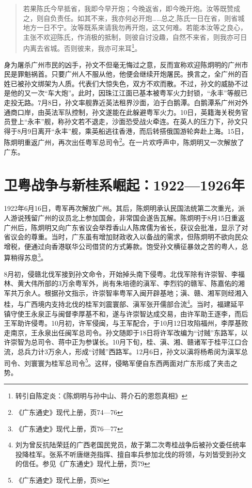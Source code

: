\begin{quote}
若果陈氏今早抵省，我即今早开炮；今晚返省，即今晚开炮。汝等既赞成之，则自负责任。如其不来，我亦何必开炮……总之,陈氏一日在省，则省城地方一日不宁。汝等既系来请我勿再开炮，这又何难。若能本汝等之良心，主张不欢迎陈氏，作消极的抵制，则彼自讨没趣，自然不来省，则我亦可日内离去省城。否则彼来，我亦可来耳\footnote{转引自陈定炎：《陈炯明与孙中山、蒋介石的恩怨真相》}。

\end{quote}

身为屠杀广州市民的凶手，孙文不但毫无悔过之意，反而宣称欢迎陈炯明的广州市民是罪魁祸首。只要广州人不服从他，他便会继续开炮屠民。换言之，全广州的百姓已被孙文绑架为人质。代表们大惊失色，双方不欢而散。不过，孙文的威胁不过是他的又一次“车大炮”。此时，因珠江江面已基本被粤军火力封锁，“永丰”等舰已走投无路。7月8日，孙文率舰靠近英法租界沙面，泊于白鹅潭。白鹅潭系广州对外通商口岸，由英法军队控制，孙文遂能在此躲避粤军火力。10日，英籍海关税务官员登上“永丰”舰，称孙文若不退走，沙面恐受战火牵连。在英人的压力下，孙文只得于8月9日离开“永丰”舰，乘英船逃往香港，而后转搭俄国游轮奔赴上海。15日，陈炯明重返广州，再次出任粤军总司令\footnote{《广东通史》现代上册，页74—76}。在一片欢呼声中，陈炯明又一次解放了广东。

\section{卫粤战争与新桂系崛起：1922—1926年}

1922年6月16日，粤军再次解放广州。其后，陈炯明承认民国法统第二次重光，派人游说残留广州的议员北上参加国会，非常国会遂告瓦解。陈炯明于8月15日重返广州后，陈炯明又向广东省议会举荐香山人陈席儒为省长，获议会批准，显示了对省议会的尊重。当时，广东虽有增加财政收入以备战的需求，但陈炯明不欲向民众增税，便通过向香港联华公司借贷的方式筹款。饱受孙文横征暴敛之苦的粤人，总算稍得苏息\footnote{《广东通史》现代上册，页76—77}。

8月初，侵赣北伐军接到孙文命令，开始掉头南下侵粤。北伐军除有许崇智、李福林、黄大伟所部的3万余粤军外，尚有朱培德的滇军、李烈钧的赣军、陈嘉佑的湘军共万余人。根据孙文指示，许崇智率粤军入闽开辟基地；滇、赣、湘军则经湘入桂，与广西境内支持北伐的桂军刘震寰部、滇军张开儒部合流\footnote{刘为曾反抗陆荣廷的广西老国民党员，故于第二次粤桂战争后被孙文委任统率投降桂军。张系不听唐继尧指挥、擅自率兵参加北伐的将领，与刘皆受到孙文的信任。参见《广东通史》现代上册，页79}。当时，福建延平镇守使王永泉正与闽督李厚基不和，遂与许崇智达成交易，由许军助王逐李，而后王军助许侵粤。10月初，许军侵闽，与王军配合，于10月12日攻陷福州，李厚基败走南京，王永泉出任闽军总司令。孙文随即于18日将许军改编为“讨贼”东路军，以许崇智为总司令、蒋中正为参谋长。10月下旬，桂、滇、湘、赣诸军于桂平江口合流，总兵力计3万余人，形成“讨贼”西路军。12月6日，孙文以滇将杨希闵为滇军总司令、刘寰寰为桂军总司令\footnote{《广东通史》现代上册，页80}。这样，侵略军便自东西两面对广东形成了夹击之势。

